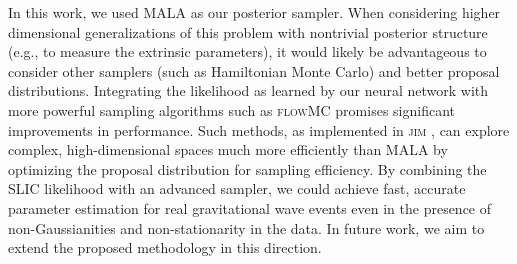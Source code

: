 \documentclass[twocolumn]{aastex631}
\begin{document}
In this work, we used MALA as our posterior sampler. When considering higher dimensional generalizations of this problem with nontrivial posterior structure (e.g., to measure the extrinsic parameters), it would likely be advantageous to consider other samplers (such as Hamiltonian Monte Carlo) and better proposal distributions. Integrating the likelihood as learned by our neural network with more powerful sampling algorithms such as \textsc{flowMC} \citep{Wong:2022xvh} promises significant improvements in performance. Such methods, as implemented in \textsc{jim} \citep[e.g.,][]{Wong:2023lgb}, can explore complex, high-dimensional spaces much more efficiently than MALA by optimizing the proposal distribution for sampling efficiency. By combining the SLIC likelihood with an advanced sampler, we could achieve fast, accurate parameter estimation for real gravitational wave events even in the presence of non-Gaussianities and non-stationarity in the data.
In future work, we aim to extend the proposed methodology in this direction.
\end{document}
